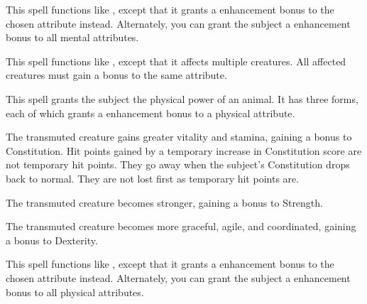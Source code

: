 \begin{spelleffect}
    This spell functions like , except that it grants a  enhancement bonus to the chosen attribute instead. Alternately, you can grant the subject a  enhancement bonus to all mental attributes.
\end{spelleffect}

\begin{spelleffect}
    This spell functions like , except that it affects multiple creatures. All affected creatures must gain a bonus to the same attribute.
\end{spelleffect}

\spelldur{\durshort}
\begin{spelleffect}
    This spell grants the subject the physical power of an animal. It has three forms, each of which grants a  enhancement bonus to a physical attribute.
    \par {} The transmuted creature gains greater vitality and stamina, gaining a bonus to Constitution. Hit points gained by a temporary increase in Constitution score are not temporary hit points. They go away when the subject's Constitution drops back to normal. They are not lost first as temporary hit points are.
    \par {} The transmuted creature becomes stronger, gaining a bonus to Strength.
    \par {} The transmuted creature becomes more graceful, agile, and coordinated, gaining a bonus to Dexterity.
\end{spelleffect}

\begin{spelleffect}
    This spell functions like , except that it grants a  enhancement bonus to the chosen attribute instead. Alternately, you can grant the subject a  enhancement bonus to all physical attributes.
\end{spelleffect}

